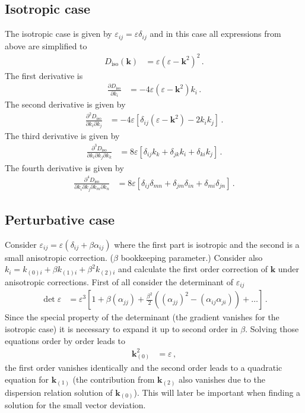 \documentclass[12pt,a4paper,twoside,openright,BCOR10mm,headsepline,titlepage,abstracton,chapterprefix,final]{scrreprt}
\newcommand{\vct}[1]{\mathbf{#1}}
\newcommand{\eps}[1]{\varepsilon_{#1}}
\newcommand{\an}[1]{\alpha_{#1}}
\begin{document}
\subsection{Isotropic case}
The isotropic case is given by $\eps{ij} = \varepsilon \delta_{ij}$ and in this case all expressions from above are simplified to
\begin{align}
 D_\text{iso}(\vct{k}) &= \varepsilon (\varepsilon - \vct{k}^2)^2\,.
\end{align}
The first derivative is
\begin{align}
 \frac{\partial D_\text{iso}}{\partial k_i} &= -4 \varepsilon (\varepsilon - \vct{k}^2) k_i\,.
\end{align}
The second derivative is given by
\begin{align}
 \frac{\partial^2 D_\text{iso}}{\partial k_i \partial k_j} &= -4 \varepsilon [ \delta_{ij} (\varepsilon - \vct{k}^2) - 2 k_i k_j ]\,.
\end{align}
The third derivative is given by
\begin{align}
 \frac{\partial^3 D_\text{iso}}{\partial k_i \partial k_j \partial k_k} &= 8 \varepsilon [ \delta_{ij} k_k + \delta_{jk} k_i + \delta_{ki} k_j ]\,.
\end{align}
The fourth derivative is given by
\begin{align}
 \frac{\partial^4 D_\text{iso}}{\partial k_i \partial k_j \partial k_m \partial k_n} &= 8 \varepsilon [ \delta_{ij} \delta_{mn} + \delta_{jm} \delta_{in} + \delta_{mi} \delta_{jn} ]\,.
\end{align}





\subsection{Perturbative case}

Consider $\eps{ij} = \varepsilon (\delta_{ij} + \beta \an{ij})$ where the first part is isotropic and the second is a small anisotropic correction.
($\beta$ bookkeeping parameter.)
Consider also $k_i = k_{(0)i} + \beta k_{(1)i} + \beta^2 k_{(2)i}$ and calculate the first order correction of $\vct{k}$ under anisotropic corrections.
First of all consider the determinant of $\eps{ij}$
\begin{align}
 \det\varepsilon &= \varepsilon^3 \left[1 + \beta (\an{jj}) + \frac{\beta^2}{2} ( (\an{jj})^2 - (\an{ij}\an{ji}) ) + \dots\right]\,.
\end{align}
Since the special property of the determinant (the gradient vanishes for the isotropic case) it is necessary to expand it up to second order in $\beta$.
Solving those equations order by order leads to
\begin{align}
 \vct{k}_{(0)}^2 &= \varepsilon\,,
\end{align}
the first order vanishes identically and the second order leads to a quadratic equation for $\vct{k}_{(1)}$ (the contribution from $\vct{k}_{(2)}$ also
vanishes due to the dispersion relation solution of $\vct{k}_{(0)}$).
This will later be important when finding a solution for the small vector deviation.
\end{document}
